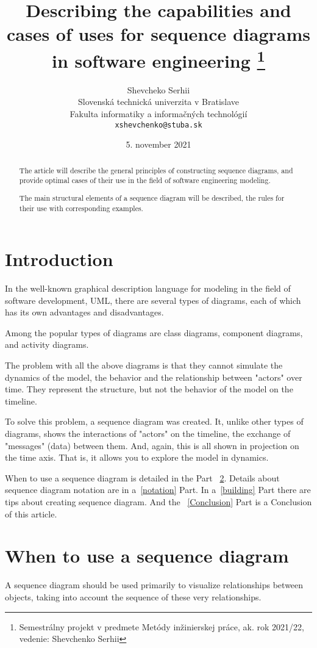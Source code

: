 \documentclass[10pt,twoside,slovak,a4paper]{article}
\title{Describing the capabilities and cases of uses for sequence diagrams in software engineering \thanks{Semestrálny projekt v predmete Metódy inžinierskej práce, ak. rok 2021/22, vedenie: Shevchenko Serhii}} %
\author{Shevcheko Serhii\\[2pt]
	{\small Slovenská technická univerzita v Bratislave}\\
	{\small Fakulta informatiky a informačných technológií}\\
	{\small \texttt{xshevchenko@stuba.sk}}
	}
\date{\small 5. november 2021}
\begin{document}
\maketitle

\begin{abstract}
The article will describe the general principles of constructing sequence diagrams, and provide optimal cases of their use in the field of software engineering modeling.

The main structural elements of a sequence diagram will be described, the rules for their use with corresponding examples.
\end{abstract}



\section{Introduction}

In the well-known graphical description language for modeling in the field of software development, UML, there are several types of diagrams, each of which has its own advantages and disadvantages.

Among the popular types of diagrams are class diagrams, component diagrams, and activity diagrams.

The problem with all the above diagrams is that they cannot simulate the dynamics of the model, the behavior and the relationship between "actors" over time. They represent the structure, but not the behavior of the model on the timeline.

To solve this problem, a sequence diagram was created. It, unlike other types of diagrams, shows the interactions of "actors" on the timeline, the exchange of "messages" (data) between them. And, again, this is all shown in projection on the time axis. That is, it allows you to explore the model in dynamics.

When to use a sequence diagram is detailed in the Part ~\ref{when}. Details about sequence diagram notation are in a~\ref{notation} Part. In a~\ref{building} Part there are tips about creating sequence diagram. And the ~\ref{Conclusion} Part is a Conclusion of this article.

\section{When to use a sequence diagram} \label{when}
A sequence diagram should be used primarily to visualize relationships between objects, taking into account the sequence of these very relationships.~\cite{IBM_SD}
\end{document}
